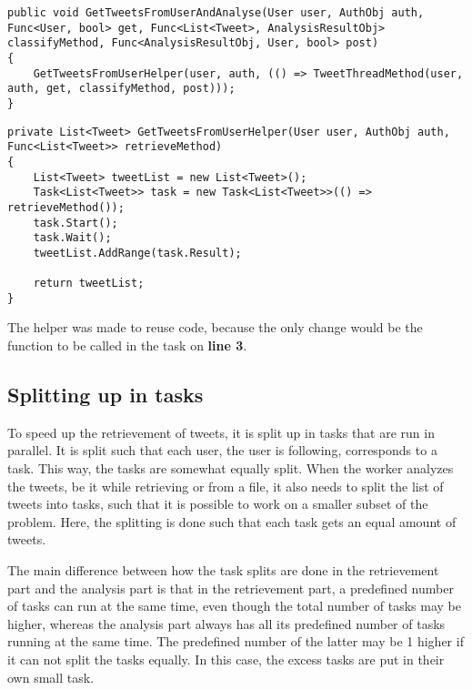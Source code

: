 \begin{minipage}[H]{\linewidth}
\begin{lstlisting}[caption = Current method call to speed up execution , label =
NewUserTweet ] 
public void GetTweetsFromUserAndAnalyse(User user, AuthObj auth, Func<User, bool> get, Func<List<Tweet>, AnalysisResultObj> classifyMethod, Func<AnalysisResultObj, User, bool> post)
{
    GetTweetsFromUserHelper(user, auth, (() => TweetThreadMethod(user, auth, get, classifyMethod, post)));
}
\end{lstlisting}
\end{minipage}

\begin{minipage}[H]{\linewidth}
\begin{lstlisting}[caption = The GetTweetsFromUserHelper, label =
UserTweetHelper]
private List<Tweet> GetTweetsFromUserHelper(User user, AuthObj auth, Func<List<Tweet>> retrieveMethod)
{
    List<Tweet> tweetList = new List<Tweet>();
    Task<List<Tweet>> task = new Task<List<Tweet>>(() => retrieveMethod());
    task.Start();
    task.Wait();
    tweetList.AddRange(task.Result);

    return tweetList;
}
\end{lstlisting}
\end{minipage}

The helper was made to reuse code, because the only change would be the function to be
called in the task on \textbf{line 3}.\\

\subsection{Splitting up in tasks}

To speed up the retrievement of tweets, it is split up in tasks that are run in
parallel. It is split such that each user, the user is following, corresponds
to a task. This way, the tasks are somewhat equally split. 
When the worker analyzes the tweets, be it while retrieving or from a file, it
also needs to split the list of tweets into tasks, such that it is possible to work on a smaller subset of the
problem. Here, the splitting is done such that each task gets an equal amount of
tweets.

The main difference between how the task splits are done in the retrievement
part and the analysis part is that in the retrievement part, a predefined number
of tasks can run at the same time, even though the total number of tasks may be
higher, whereas the analysis part always has all its predefined number of tasks
running at the same time. The predefined number of the latter may be 1 higher if
it can not split the tasks equally. In this case, the excess tasks are
put in their own small task. 

